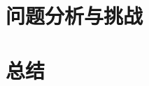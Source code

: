 \documentclass[a4paper,twoside,AutoFakeBold]{article}
\theoremstyle{definition}
\begin{document}
%
\section{问题分析与挑战}\label{section:problem}

%
\section{总结}\label{section:conclusion}






\end{document}
